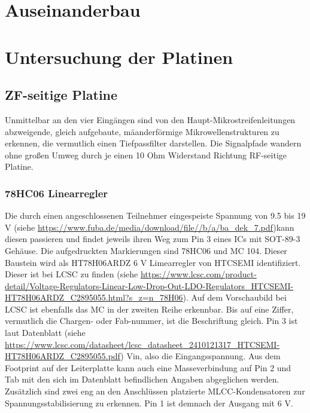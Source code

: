 \documentclass[]{article}
\begin{document}
	\section{Auseinanderbau}
	
	
	\section{Untersuchung der Platinen}
	
	\subsection{ZF-seitige Platine}
		
		Unmittelbar an den vier Eingängen sind von den Haupt-Mikrostreifenleitungen abzweigende, gleich aufgebaute, mäanderförmige Mikrowellenstrukturen zu erkennen, die vermutlich einen Tiefpassfilter darstellen. Die Signalpfade wandern ohne großen Umweg durch je einen 10 Ohm Widerstand Richtung RF-seitige Platine.\\
		
	\subsubsection{78HC06 Linearregler}
		
		\noindent Die durch einen angeschlossenen Teilnehmer eingespeiste Spannung von 9.5 bis 19 V (siehe \url{https://www.fuba.de/media/download/file//b/a/ba\_dek\_7.pdf})kann diesen passieren und findet jeweils ihren Weg zum Pin 3 eines ICs mit SOT-89-3 Gehäuse. Die aufgedruckten Markierungen sind 78HC06 und MC 104. Dieser Baustein wird als HT78H06ARDZ 6 V Limearregler von HTCSEMI identifiziert. Dieser ist bei LCSC zu finden (siehe \url{https://www.lcsc.com/product-detail/Voltage-Regulators-Linear-Low-Drop-Out-LDO-Regulators_HTCSEMI-HT78H06ARDZ_C2895055.html?s_z=n_78H06}). Auf dem Vorschaubild bei LCSC ist ebenfalls das MC in der zweiten Reihe erkennbar. Bis auf eine Ziffer, vermutlich die Chargen- oder Fab-nummer, ist die Beschriftung gleich. Pin 3 ist laut Datenblatt (siehe \url{https://www.lcsc.com/datasheet/lcsc_datasheet_2410121317_HTCSEMI-HT78H06ARDZ_C2895055.pdf}) Vin, also die Eingangsspannung. Aus dem Footprint auf der Leiterplatte kann auch eine Masseverbindung auf Pin 2 und Tab mit den sich im Datenblatt befindlichen Angaben abgeglichen werden. Zusätzlich sind zwei eng an den Anschlüssen platzierte MLCC-Kondensatoren zur Spannungsstabilisierung zu erkennen. Pin 1 ist demnach der Ausgang mit 6 V.\\
		
\end{document}
